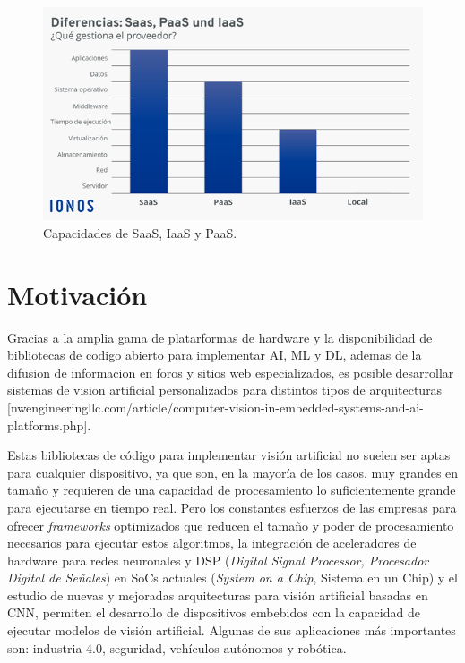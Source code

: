 \begin{figure}[h]
	\centering
	\includegraphics[scale=0.55]{./Figures/cloud_services.png}
	\caption{Capacidades de SaaS, IaaS y PaaS\protect\footnotemark.}
	\label{fig:cloud_services}
\end{figure}


\section{Motivación}
Gracias a la amplia gama de platarformas de hardware y la disponibilidad de bibliotecas de codigo abierto para implementar AI, ML y DL, ademas de la difusion de informacion en foros y sitios web especializados, es posible desarrollar sistemas de vision artificial personalizados para distintos tipos de arquitecturas [nwengineeringllc.com/article/computer-vision-in-embedded-systems-and-ai-platforms.php].

Estas bibliotecas de código para implementar visión artificial no suelen ser aptas para cualquier dispositivo, ya que son, en la mayoría de los casos, muy grandes en tamaño y requieren de una capacidad de procesamiento lo suficientemente grande para ejecutarse en tiempo real. Pero los constantes esfuerzos de las empresas para ofrecer \textit{frameworks} optimizados que reducen el tamaño y poder de procesamiento necesarios para ejecutar estos algoritmos, la integración de aceleradores de hardware para redes neuronales y DSP (\textit{Digital Signal Processor, Procesador Digital de Señales}) en SoCs actuales (\textit{System on a Chip}, Sistema en un Chip) y el estudio de nuevas y mejoradas arquitecturas para visión artificial basadas en CNN, permiten el desarrollo de dispositivos embebidos con la capacidad de ejecutar modelos de visión artificial. Algunas de sus aplicaciones más importantes son: industria 4.0, seguridad, vehículos autónomos y robótica.

